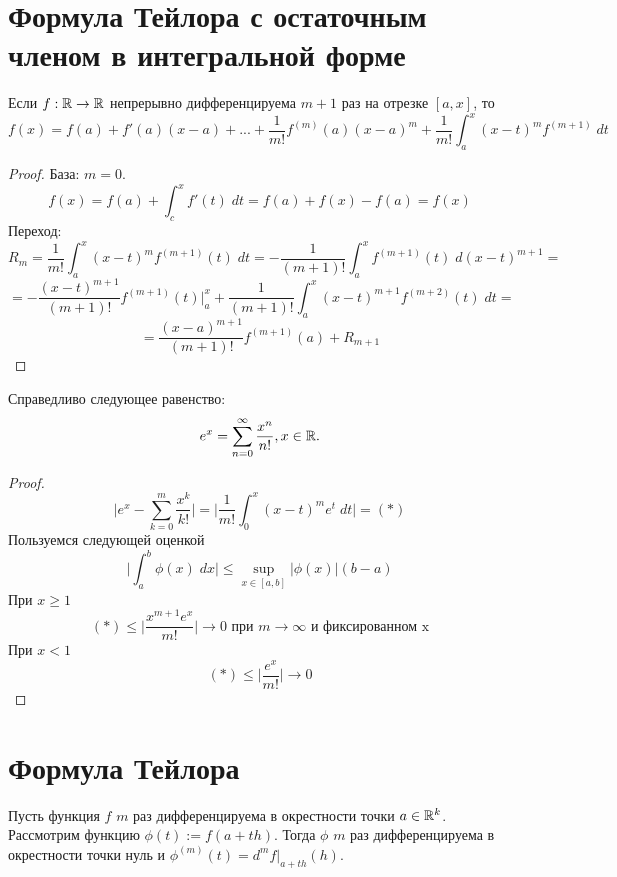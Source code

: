     \section{Формула Тейлора с остаточным членом в интегральной форме}
    
    \begin{theorem}
    	Если $f: \mathbb R \rightarrow \mathbb R$ непрерывно дифференцируема $m + 1$ раз на отрезке $[a, x]$, то
    	\[ f(x) = f(a) + f'(a)(x - a) + ... + \frac{1}{m!}f^{(m)}(a)(x - a)^m + \frac{1}{m!} \int_a^x (x - t)^m f^{(m + 1)} \; dt \]
    \end{theorem}
    
    \begin{proof}
    	База: $m = 0$.
    	\[ f(x) = f(a) + \int_c^x f'(t) \; dt = f(a) + f(x) - f(a) = f(x) \]
    	Переход:
    	\[ R_m = \frac{1}{m!} \int_a^x (x - t)^m f^{(m + 1)}(t) \; dt = -\frac{1}{(m + 1)!} \int_a^x f^{(m + 1)}(t) \; d(x - t)^{m + 1} = \]
    	\[ = -\frac{(x - t)^{m + 1}}{(m + 1)!} f^{(m + 1)}(t)\bigg|_a^x + \frac{1}{(m + 1)!} \int_a^x (x - t)^{m + 1} f^{(m + 2)}(t) \; dt = \]
    	\[ = \frac{(x - a)^{m + 1}}{(m + 1)!} f^{(m + 1)}(a) + R_{m + 1} \]
    \end{proof}
    
    \begin{corollary}
    	Справедливо следующее равенство:
    	\[ e^x = \sum_{n = 0}^{\infty} \frac{x^n}{n!}, x \in \mathbb R. \]
    \end{corollary}
    
    \begin{proof}
    	\[ \bigg|e^x - \sum_{k = 0}^m \frac{x^k}{k!}\bigg| = \bigg|\frac{1}{m!} \int_0^x (x - t)^m e^t \; dt\bigg| = (*) \]
    	Пользуемся следующей оценкой
    	\[ \bigg|\int_a^b \phi(x) \; dx\bigg| \leqslant \sup_{x \in [a, b]} |\phi(x)|(b - a) \]
    	При $x \geqslant 1$
    	\[ (*) \leqslant \bigg|\frac{x^{m + 1} e^x}{m!}\bigg| \to 0 \text{ при } m \to \infty \text{ и фиксированном x} \]
    	При $x < 1$
    	\[ (*) \leqslant \bigg|\frac{e^x}{m!}\bigg| \to 0 \]
    \end{proof}
    
    \section{Формула Тейлора}
    
    \begin{lemma}
    	Пусть функция $f$ $m$ раз дифференцируема в окрестности точки $a \in \mathbb R^k$. Рассмотрим функцию $\phi(t) := f(a + th)$. Тогда $\phi$ $m$ раз дифференцируема в окрестности точки нуль и $\phi^{(m)}(t) = d^mf|_{a + th}(h)$.
    \end{lemma}
    
